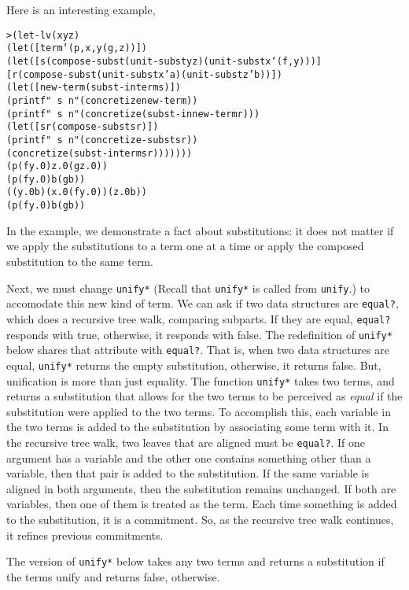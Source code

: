 Here is an interesting example,

\begin{alltt}
> (let-lv (x y z)
    (let ([term `(p ,x ,y (g ,z))])
      (let ([s (compose-subst (unit-subst y z) (unit-subst x `(f ,y)))]
            [r (compose-subst (unit-subst x 'a) (unit-subst z 'b))])
        (let ([new-term (subst-in term s)])
          (printf "~s~n" (concretize new-term))
          (printf "~s~n" (concretize (subst-in new-term r)))
          (let ([sr (compose-subst s r)])
            (printf "~s~n" (concretize-subst sr))
            (concretize (subst-in term sr)))))))
(p (f y.0) z.0 (g z.0))
(p (f y.0) b (g b))
((y.0 b) (x.0 (f y.0)) (z.0 b))
(p (f y.0) b (g b))
\end{alltt}

In the example, we demonstrate a fact about substitutions: it does not
matter if we apply the substitutions to a term one at a time or apply
the composed substitution to the same term.

Next, we must change \texttt{unify*} (Recall that \texttt{unify*} is
called from \texttt{unify}.) to accomodate this new kind of term.  We
can ask if two data structures are \texttt{equal?}, which does a
recursive tree walk, comparing subparts.  If they are equal,
\texttt{equal?} responds with true, otherwise, it responds with false.
The redefinition of \texttt{unify*} below shares that attribute with
\texttt{equal?}. That is, when two data structures are equal,
\texttt{unify*} returns the empty substitution, otherwise, it returns
false.  But, unification is more than just equality.  The function
\texttt{unify*} takes two terms, and returns a substitution that allows
for the two terms to be perceived as \emph{equal} if the substitution
were applied to the two terms.  To accomplish this, each variable in
the two terms is added to the substitution by associating some term
with it.  In the recursive tree walk, two leaves that are aligned must
be \texttt{equal?}.  If one argument has a variable and the other one
contains something other than a variable, then that pair is added to
the substitution.  If the same variable is aligned in both arguments,
then the substitution remains unchanged.  If both are variables, then
one of them is treated as the term.  Each time something is added to
the substitution, it is a commitment. So, as the recursive tree walk
continues, it refines previous commitments.

The version of \texttt{unify*} below takes any two terms and returns a
substitution if the terms unify and returns false, otherwise.

